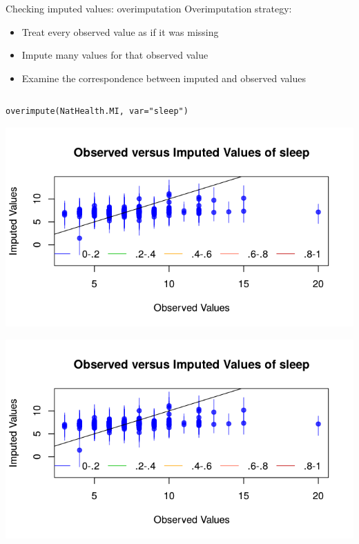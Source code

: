 \documentclass[table,smaller]{beamer}
\begin{document}
\begin{frame}[fragile,label=sec-6-5]{Checking imputed values: overimputation}
 Overimputation strategy:
\begin{itemize}
\item Treat every observed value as if it was missing
\item Impute many values for that observed value
\item Examine the correspondence between imputed and observed values
\end{itemize}

\begin{columns}  \begin{block}{}
\begin{verbatim}
overimpute(NatHealth.MI, var="sleep")
\end{verbatim}

\includegraphics[width=.9\linewidth]{images/overImputed.png}

\includegraphics[width=.9\linewidth]{images/overImputed.png}


\end{block} \end{columns}
\end{frame}
\end{document}

